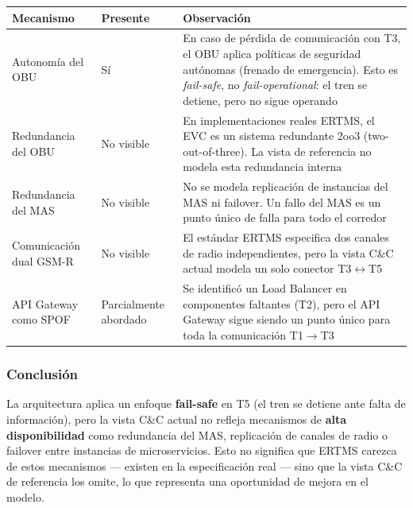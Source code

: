 \documentclass[a4paper, 10 pt]{article}
\begin{document}
\begin{table}[H]
\centering
\footnotesize
\begin{tabular}{|R{0.16\textwidth}|M{0.14\textwidth}|R{0.5\textwidth}|}
\hline
\textbf{Mecanismo} & \textbf{Presente} & \textbf{Observación} \\
\hline
Autonomía del OBU & Sí & En caso de pérdida de comunicación con T3, el OBU aplica políticas de seguridad autónomas (frenado de emergencia). Esto es \textit{fail-safe}, no \textit{fail-operational}: el tren se detiene, pero no sigue operando \\
\hline
Redundancia del OBU & No visible & En implementaciones reales ERTMS, el EVC es un sistema redundante 2oo3 (two-out-of-three). La vista de referencia no modela esta redundancia interna \\
\hline
Redundancia del MAS & No visible & No se modela replicación de instancias del MAS ni failover. Un fallo del MAS es un punto único de falla para todo el corredor \\
\hline
Comunicación dual GSM-R & No visible & El estándar ERTMS especifica dos canales de radio independientes, pero la vista C\&C actual modela un solo conector T3$\leftrightarrow$T5 \\
\hline
API Gateway como SPOF & Parcialmente abordado & Se identificó un Load Balancer en componentes faltantes (T2), pero el API Gateway sigue siendo un punto único para toda la comunicación T1$\rightarrow$T3 \\
\hline
\end{tabular}
\end{table}

\subsubsection{Conclusión}

La arquitectura aplica un enfoque \textbf{fail-safe} en T5 (el tren se detiene ante falta de información), pero la vista C\&C actual no refleja mecanismos de \textbf{alta disponibilidad} como redundancia del MAS, replicación de canales de radio o failover entre instancias de microservicios. Esto no significa que ERTMS carezca de estos mecanismos --- existen en la especificación real --- sino que la vista C\&C de referencia los omite, lo que representa una oportunidad de mejora en el modelo.
\end{document}
